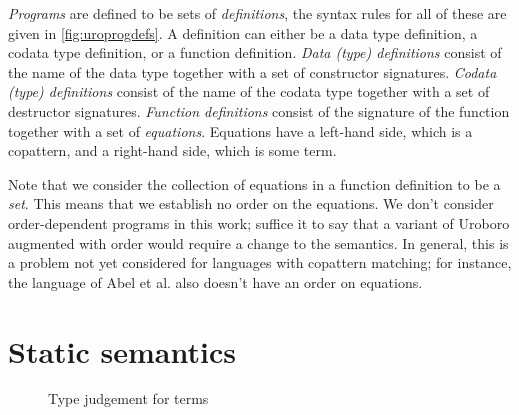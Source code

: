 \textit{Programs} are defined to be sets of \textit{definitions}, the syntax rules for all of these are given in \autoref{fig:uroprogdefs}. A definition can either be a data type definition, a codata type definition, or a function definition. \textit{Data (type) definitions} consist of the name of the data type together with a set of constructor signatures. \textit{Codata (type) definitions} consist of the name of the codata type together with a set of destructor signatures. \textit{Function definitions} consist of the signature of the function together with a set of \textit{equations}. Equations have a left-hand side, which is a copattern, and a right-hand side, which is some term.

Note that we consider the collection of equations in a function definition to be a \textit{set}. This means that we establish no order on the equations. We don't consider order-dependent programs in this work; suffice it to say that a variant of Uroboro augmented with order would require a change to the semantics. In general, this is a problem not yet considered for languages with copattern matching; for instance, the language of Abel et al.\cite{abel13copatterns} also doesn't have an order on equations.

\section{Static semantics}
\label{sec:urostatsem}

\begin{figure}
\begin{prooftree}
\end{prooftree}

\begin{prooftree}
\end{prooftree}

\begin{prooftree}
\end{prooftree}

\begin{prooftree}
\end{prooftree}
\caption{Type judgement for terms}
\label{fig:typjterm}
\end{figure}

